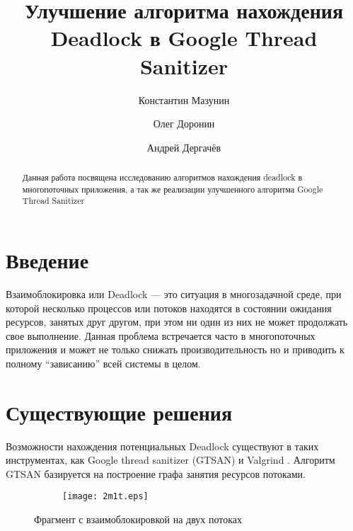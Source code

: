 \documentclass[runningheads, extrasrussian]{llncs}
\begin{document}
\title{Улучшение алгоритма нахождения Deadlock в Google Thread Sanitizer}

\author{Константин Мазунин \and Олег Доронин \and Андрей Дергачёв}



\maketitle

\begin{abstract}
Данная работа посвящена исследованию алгоритмов нахождения deadlock в многопоточных приложения, а так же реализации улучшенного алгоритма Google Thread Sanitizer

\end{abstract}

\section{Введение}
Взаимоблокировка или Deadlock \cite{ref_pthread} — это ситуация в многозадачной среде, при которой несколько процессов или потоков находятся в состоянии ожидания ресурсов, занятых друг другом, при этом ни один из них не может продолжать свое выполнение. Данная проблема встречается часто в многопоточных приложения и может не только снижать производительность но и приводить к полному “зависанию” всей системы в целом.

\section{Существующие решения}
Возможности нахождения потенциальных Deadlock существуют в таких инструментах, как Google thread sanitizer (GTSAN) \cite{ref_gtsan_github} и Valgrind  \cite{ref_valgrind}. Алгоритм GTSAN базируется на построение графа занятия ресурсов потоками. 

\begin{figure}[htbp]
    \centering
    \begin{subfigure}[h]{0.4\textwidth}
        \centering
        
    \end{subfigure}
    \hfill
    \begin{subfigure}[h]{0.4\textwidth}
        \centering
        \texttt{[image: 2m1t.eps]}
    \end{subfigure}
    \caption{Фрагмент с взаимоблокировкой на двух потоках}%
    \label{fig:2m2t-d}
\end{figure}
\end{document}
